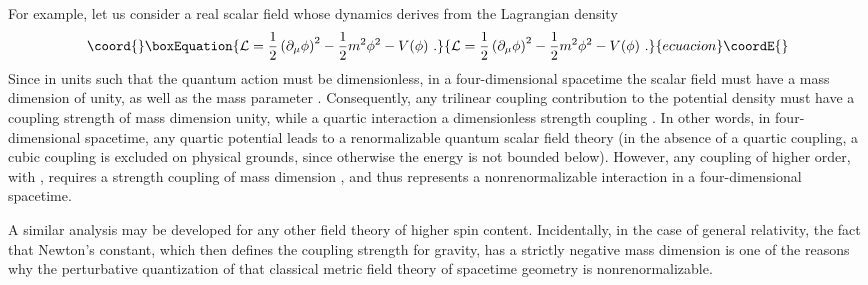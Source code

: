 \documentclass[a4paper,11pt]{article}
\begin{document}
For example, let us consider a real scalar field \myHighlight{$\phi$}\coordHE{} whose dynamics
derives from the Lagrangian density
\begin{equation}\coord{}\boxEquation{
{\cal L}=\frac{1}{2}\left(\partial_\mu\phi\right)^2-\frac{1}{2}m^2\phi^2-
V(\phi)\ .
}{
{\cal L}=\frac{1}{2}\left(\partial_\mu\phi\right)^2-\frac{1}{2}m^2\phi^2-
V(\phi)\ .
}{ecuacion}\coordE{}\end{equation}
Since in units such that \coordHE{} the quantum action must be dimensionless,
in a four-dimensional spacetime the scalar field must have a mass dimension
of unity, as well as the mass parameter \coordHE{}. Consequently, any trilinear
coupling \coordHE{} contribution to the potential density \coordHE{} must
have a coupling strength \coordHE{} of mass dimension unity, while a quartic
interaction \coordHE{} a dimensionless strength coupling \myHighlight{$\lambda$}\coordHE{}. 
In other words, in four-dimensional spacetime, any quartic potential \coordHE{}
leads to a renormalizable quantum scalar field theory (in the absence of
a quartic coupling, a cubic coupling is excluded on physical grounds, since
otherwise the energy is not bounded below). However, any coupling of
higher order, \coordHE{} with \coordHE{}, requires a strength coupling of mass
dimension \coordHE{}, and thus represents a nonrenormalizable interaction
in a four-dimensional spacetime.

A similar analysis may be developed for any other field theory
of higher spin content. Incidentally, in the case of general relativity,
the fact that Newton's constant, which then defines the coupling strength for
gravity, has a strictly negative mass dimension is one of the reasons why
the perturbative quantization of that classical metric field theory of
spacetime geometry is nonrenormalizable.
\end{document}

